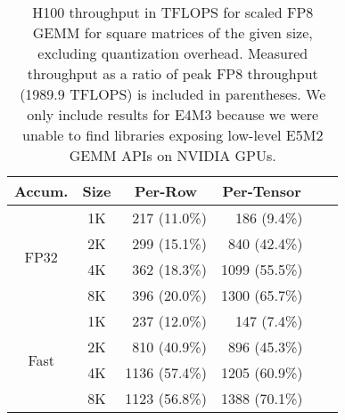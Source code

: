 \begin{table}[ht]
\caption{H100 throughput in TFLOPS for scaled FP8 GEMM for square matrices of the given size, excluding quantization overhead. Measured throughput as a ratio of peak FP8 throughput (1989.9 TFLOPS) is included in parentheses. We only include results for E4M3 because we were unable to find libraries exposing low-level E5M2 GEMM APIs on NVIDIA GPUs.}
\centering
\begin{tabular}{@{}ccrrrr@{}}
\toprule
Accum. & Size & \multicolumn{1}{c}{Per-Row} & \multicolumn{1}{c}{Per-Tensor} \\ \midrule
\multirow{4}{*}{FP32} & 1K & 217  (11.0\%) & 186 \:  (9.4\%) \\
                      & 2K & 299  (15.1\%) & 840  (42.4\%) \\
                      & 4K & 362  (18.3\%) & 1099 (55.5\%) \\
                      & 8K & 396  (20.0\%) & 1300 (65.7\%) \\ \midrule
\multirow{4}{*}{Fast} & 1K & 237  (12.0\%) & 147 \: (7.4\%) \\
                      & 2K & 810  (40.9\%) & 896  (45.3\%) \\
                      & 4K & 1136 (57.4\%) & 1205 (60.9\%) \\
                      & 8K & 1123 (56.8\%) & 1388 (70.1\%) \\ \bottomrule
\end{tabular}
\label{tab:h100_fp8_tflops}
\end{table}





